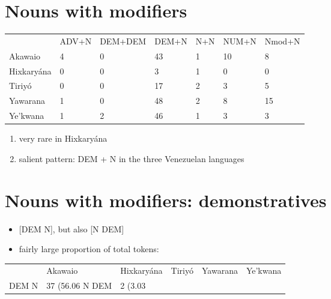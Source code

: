 \documentclass[10pt]{article}
\begin{document}
\section{Nouns with modifiers}\begin{tabular}[t]{lllllll}

           & ADV+N & DEM+DEM & DEM+N & N+N & NUM+N & Nmod+N \\

   Akawaio &     4 &       0 &    43 &   1 &    10 &      8 \\
Hixkaryána &     0 &       0 &     3 &   1 &     0 &      0 \\
    Tiriyó &     0 &       0 &    17 &   2 &     3 &      5 \\
  Yawarana &     1 &       0 &    48 &   2 &     8 &     15 \\
  Ye'kwana &     1 &       2 &    46 &   1 &     3 &      3 \\

\end{tabular}

\begin{enumerate}
\def\labelenumi{\arabic{enumi}.}
\tightlist
\item
  very rare in Hixkaryána
\item
  salient pattern: DEM + N in the three Venezuelan languages
\end{enumerate}

\section{Nouns with modifiers: demonstratives}

\begin{itemize}
\tightlist
\item
  {[}DEM N{]}, but also {[}N DEM{]}
\item
  fairly large proportion of total tokens:
\end{itemize}\begin{tabular}[t]{llllll}

      &     Akawaio & Hixkaryána &     Tiriyó &    Yawarana &    Ye'kwana \\

DEM N & 37 (56.06%
N DEM &   2 (3.03%

\end{tabular}
\end{document}
